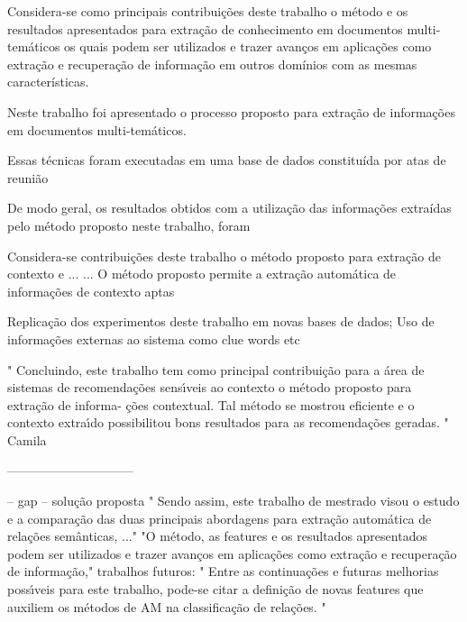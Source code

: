 	Considera-se como principais contribuições deste trabalho o método e os resultados apresentados para extração de conhecimento em documentos multi-temáticos os quais podem ser utilizados e trazer avanços em aplicações como extração e recuperação de informação em outros domínios com as mesmas características.


















Neste trabalho foi apresentado o processo proposto para extração de informações em documentos multi-temáticos.


Essas técnicas foram executadas em uma base de dados constituída por atas de reunião



De modo geral, os resultados obtidos com a utilização das informações extraídas pelo método
proposto neste trabalho, foram 



Considera-se contribuições deste trabalho o método proposto para extração de contexto e
...
...
O método proposto permite a extração automática de informações de contexto aptas


 Replicação dos experimentos deste trabalho em novas bases de dados;
 Uso de informações externas ao sistema como clue words etc




" Concluindo, este trabalho tem como principal contribuição para a área de sistemas de recomendações sensı́veis ao contexto o método proposto para extração de informa- ções contextual. Tal método se mostrou eficiente e o contexto extraı́do possibilitou bons resultados para as recomendações geradas. "
Camila


------------------------------

-- gap
-- solução proposta
	" Sendo assim, este trabalho de mestrado visou o estudo e a comparação das duas principais abordagens para extração automática de relações semânticas, ..."
	"O método, as features e os resultados apresentados podem ser utilizados e trazer avanços em aplicações como extração e recuperação de informação,"
trabalhos futuros:
	" Entre as continuações e futuras melhorias possı́veis para este trabalho, pode-se citar a definição de novas features que auxiliem os métodos de AM na classificação de relações. "


